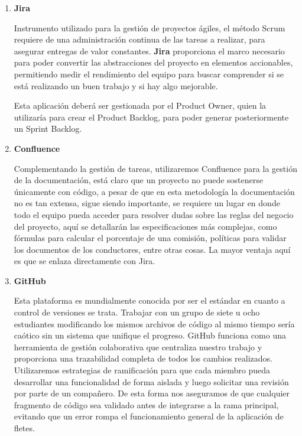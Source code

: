 \begin{enumerate}
	\item \textbf{Jira} 
	
	Instrumento utilizado para la gestión de proyectos ágiles, el método Scrum requiere de una administración continua de las tareas a realizar, para asegurar entregas de valor constantes. \textbf{Jira} proporciona el marco necesario para poder convertir las abstracciones del proyecto en elementos accionables, permitiendo medir el rendimiento del equipo para buscar comprender si se está realizando un buen trabajo y si hay algo mejorable. 
	
	Esta aplicación deberá ser gestionada por el Product Owner, quien la utilizaría para crear el Product Backlog, para poder generar posteriormente un Sprint Backlog.
	
	\item \textbf{Confluence} 
	
	Complementando la gestión de tareas, utilizaremos Confluence para la gestión de la documentación, está claro que un proyecto no puede sostenerse únicamente con código, a pesar de que en esta metodología la documentación no es tan extensa, sigue siendo importante, se requiere un lugar en donde todo el equipo pueda acceder para resolver dudas sobre las reglas del negocio del proyecto, aquí se detallarán las especificaciones más complejas, como fórmulas para calcular el porcentaje de una comisión, políticas para validar los documentos de los conductores, entre otras cosas. La mayor ventaja aquí es que se enlaza directamente con Jira.
	
	
	\item \textbf{GitHub}
	
	Esta plataforma es mundialmente conocida por ser el estándar en cuanto a control de versiones se trata. Trabajar con un grupo de siete u ocho estudiantes modificando los mismos archivos de código al mismo tiempo sería caótico sin un sistema que unifique el progreso. GitHub funciona como una herramienta de gestión colaborativa que centraliza nuestro trabajo y proporciona una trazabilidad completa de todos los cambios realizados. Utilizaremos estrategias de ramificación para que cada miembro pueda desarrollar una funcionalidad de forma aislada y luego solicitar una revisión por parte de un compañero. De esta forma nos aseguramos de que cualquier fragmento de código sea validado antes de integrarse a la rama principal, evitando que un error rompa el funcionamiento general de la aplicación de fletes.
	
\end{enumerate}
